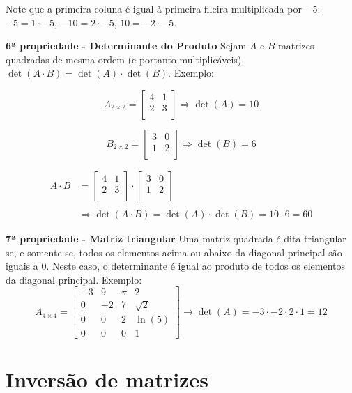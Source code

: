 \documentclass[
  letterpaper,
  DIV=11,
  numbers=noendperiod]{scrreprt}
\begin{document}
Note que a primeira coluna é igual à primeira fileira multiplicada por
\(-5\): \(-5 = 1 \cdot -5\), \(-10 = 2 \cdot -5\), \(10 = -2 \cdot -5\).

\textbf{6ª propriedade - Determinante do Produto} Sejam \(A\) e \(B\)
matrizes quadradas de mesma ordem (e portanto multiplicáveis),
\(\det(A \cdot B) = \det(A) \cdot \det(B)\). Exemplo:

\[
A_{2\times2} =
\begin{bmatrix}
    4 & 1 \\
    2 & 3 \\
\end{bmatrix}
\Rightarrow \det(A) = 10
\]

\[
B_{2\times2} =
\begin{bmatrix}
    3 & 0 \\
    1 & 2 \\
\end{bmatrix} 
\Rightarrow \det(B) = 6
\]

\[
\begin{aligned}
A \cdot B &=
\begin{bmatrix}
    4 & 1 \\
    2 & 3 \\
\end{bmatrix} 
\cdot
\begin{bmatrix}
    3 & 0 \\
    1 & 2 \\
\end{bmatrix} \\ \\
&\Rightarrow \det(A \cdot B) = \det(A) \cdot \det(B) = 10 \cdot 6 = 60
\end{aligned}
\]

\textbf{7ª propriedade - Matriz triangular} Uma matriz quadrada é dita
triangular se, e somente se, todos os elementos acima ou abaixo da
diagonal principal são iguais a \(0\). Neste caso, o determinante é
igual ao produto de todos os elementos da diagonal principal. Exemplo:
\[
A_{4\times4} =
\begin{bmatrix}
    -3 & 9 & \pi & 2  \\
    0 & -2 & 7 & \sqrt{2} \\
    0 & 0  & 2 & \ln(5) \\
    0 & 0 & 0 & 1
\end{bmatrix} 
\rightarrow \det(A) = -3 \cdot -2 \cdot 2 \cdot 1 = 12
\]

\section{Inversão de matrizes}\label{inversuxe3o-de-matrizes}
\end{document}
